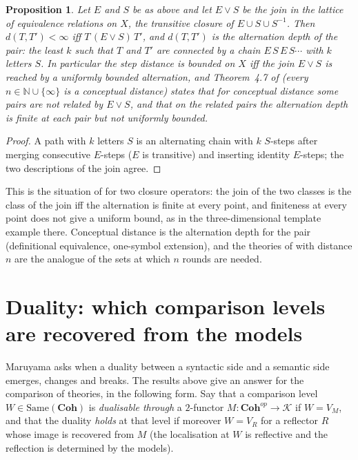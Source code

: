 \documentclass[11pt]{amsart}
\newtheorem{prop}[thm]{Proposition}
\theoremstyle{definition}
\newcommand{\Same}{\mathrm{Same}}
\newcommand{\Coh}{\mathbf{Coh}}
\begin{document}
\begin{prop}\label{prop:distance}
Let $E$ and $S$ be as above and let $E\vee S$ be the join in the lattice
of equivalence relations on $X$, the transitive closure of $E\cup S\cup
S^{-1}$. Then $d(T,T')<\infty$ iff $T\,(E\vee S)\,T'$, and $d(T,T')$ is
the alternation depth of the pair: the least $k$ such that $T$ and $T'$
are connected by a chain $E\,S\,E\,S\cdots$ with $k$ letters $S$. In
particular the step distance is bounded on $X$ iff the join $E\vee S$ is
reached by a uniformly bounded alternation, and Theorem~4.7 of
\cite{KSLF20} (every $n\in\mathbb N\cup\{\infty\}$ is a conceptual
distance) states that for conceptual distance some pairs are not related
by $E\vee S$, and that on the related pairs the alternation depth is
finite at each pair but not uniformly bounded.
\end{prop}
\begin{proof}
A path with $k$ letters $S$ is an alternating chain with $k$ $S$-steps
after merging consecutive $E$-steps ($E$ is transitive) and inserting
identity $E$-steps; the two descriptions of the join agree.
\end{proof}

This is the situation of \cite[Thm.~2.3(iii)]{Cutpoints} for two
closure operators: the join of the two classes is the class of the join
iff the alternation is finite at every point, and finiteness at every
point does not give a uniform bound, as in the three-dimensional
template example there. Conceptual distance is the alternation depth
for the pair (definitional equivalence, one-symbol extension), and the
theories of \cite[Thm.~4.7]{KSLF20} with distance $n$ are the analogue
of the sets at which $n$ rounds are needed.

\section{Duality: which comparison levels are recovered from the models}\label{sec:duality}

Maruyama \cite{Maruyama16} asks when a duality between a syntactic side
and a semantic side emerges, changes and breaks. The results above give
an answer for the comparison of theories, in the following form. Say
that a comparison level $W\in\Same(\Coh)$ is \emph{dualisable through}
a $2$-functor $M\colon\Coh^{op}\to\mathcal K$ if $W=V_M$, and that the
duality \emph{holds} at that level if moreover $W=V_R$ for a reflector
$R$ whose image is recovered from $M$ (the localisation at $W$ is
reflective and the reflection is determined by the models).
\end{document}
